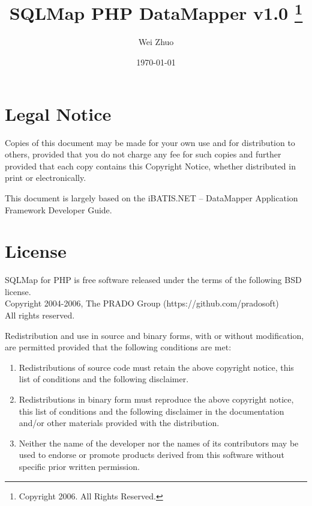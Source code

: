 \documentclass{book}
\title{\Huge \bfseries SQLMap PHP DataMapper v1.0
    \thanks{Copyright 2006. All Rights Reserved.}
}
\author{Wei Zhuo}
\date{\today}
\begin{document}
\maketitle

\pagestyle{plain}
\tableofcontents

\chapter*{Legal Notice}

Copies of this document may be made for your own use and for distribution to
others, provided that you do not charge any fee for such copies and further
provided that each copy contains this Copyright Notice, whether distributed in
print or electronically.

This document is largely based on the iBATIS.NET -- DataMapper Application
Framework Developer Guide.

\chapter*{License}
SQLMap for PHP is free software released under the terms of the following BSD license.\\
Copyright 2004-2006, The PRADO Group (https://github.com/pradosoft)\\
All rights reserved.

Redistribution and use in source and binary forms, with or without
modification, are permitted provided that the following conditions are met:
\begin{enumerate}
    \item Redistributions of source code must retain the above copyright notice,
this list of conditions and the following disclaimer.

 \item Redistributions in binary form must reproduce the above copyright notice,
this list of conditions and the following disclaimer in the documentation
and/or other materials provided with the distribution.

\item Neither the name of the developer nor the names of its contributors may
be used to endorse or promote products derived from this software without
specific prior written permission.
\end{enumerate}
\end{document}
